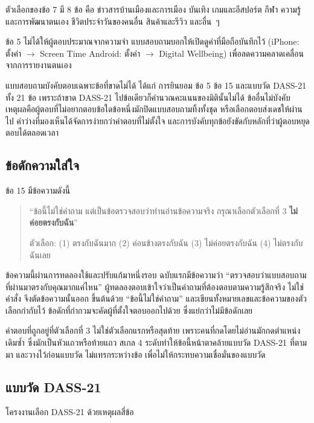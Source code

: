 ตัวเลือกของข้อ 7 มี 8 ข้อ คือ ข่าวสารบ้านเมืองและการเมือง บันเทิง เกมและอีสปอร์ต กีฬา
ความรู้และการพัฒนาตนเอง ชีวิตประจำวันของคนอื่น สินค้าและรีวิว และอื่น~ๆ

ข้อ 5 ไม่ได้ให้ผู้ตอบประมาณจากความจำ
แบบสอบถามบอกให้เปิดดูค่าที่มือถือบันทึกไว้
(iPhone: ตั้งค่า $\rightarrow$ Screen Time \quad Android: ตั้งค่า $\rightarrow$ Digital Wellbeing)
เพื่อลดความคลาดเคลื่อนจากการรายงานตนเอง

แบบสอบถามบังคับตอบเฉพาะข้อที่ขาดไม่ได้ ได้แก่ การยินยอม ข้อ 5 ข้อ 15 และแบบวัด DASS-21 ทั้ง 21 ข้อ
เพราะถ้าขาด DASS-21 ไปข้อเดียวก็คำนวณคะแนนของมิตินั้นไม่ได้
ข้ออื่นไม่บังคับ เหตุผลคือผู้ตอบที่ไม่อยากตอบข้อใดข้อหนึ่งมักปิดแบบสอบถามทิ้งทั้งชุด
หรือเลือกตอบส่งเดชให้ผ่านไป ค่าว่างที่มองเห็นได้จัดการง่ายกว่าคำตอบที่ไม่ตั้งใจ
และการบังคับทุกข้อยังขัดกับหลักที่ว่าผู้ตอบหยุดตอบได้ตลอดเวลา

\subsection{ข้อดักความใส่ใจ}

ข้อ 15 มีข้อความดังนี้

\begin{quote}
``ข้อนี้ไม่ใช่คำถาม แต่เป็นข้อตรวจสอบว่าท่านอ่านข้อความจริง
กรุณาเลือกตัวเลือกที่ 3 \textbf{ไม่ค่อยตรงกับฉัน}''

ตัวเลือก: (1) ตรงกับฉันมาก \quad (2) ค่อนข้างตรงกับฉัน
\quad (3) ไม่ค่อยตรงกับฉัน \quad (4) ไม่ตรงกับฉันเลย
\end{quote}

ข้อความนี้ผ่านการทดลองใช้และปรับแก้มาหนึ่งรอบ
ฉบับแรกมีข้อความว่า ``ตรวจสอบว่าแบบสอบถามที่ผ่านมาตรงกับคุณมากแค่ไหน''
ผู้ทดลองตอบเข้าใจว่าเป็นคำถามที่ต้องตอบตามความรู้สึกจริง ไม่ใช่คำสั่ง
จึงตัดข้อความนั้นออก ขึ้นต้นด้วย ``ข้อนี้ไม่ใช่คำถาม''
และเขียนทั้งหมายเลขและข้อความของตัวเลือกกำกับไว้
ข้อดักที่กำกวมจะคัดผู้ที่ตั้งใจตอบออกไปด้วย ซึ่งแย่กว่าไม่มีข้อดักเลย

คำตอบที่ถูกอยู่ที่ตัวเลือกที่ 3 ไม่ใช่ตัวเลือกแรกหรือสุดท้าย
เพราะคนที่กดโดยไม่อ่านมักกดตำแหน่งเดิมซ้ำ ซึ่งมักเป็นหัวแถวหรือท้ายแถว
สเกล 4 ระดับทำให้ข้อนี้หน้าตาคล้ายแบบวัด DASS-21 ที่ตามมา
และวางไว้ก่อนแบบวัด ไม่แทรกระหว่างข้อ เพื่อไม่ให้กระทบความเชื่อมั่นของแบบวัด

\subsection{แบบวัด DASS-21}

โครงงานเลือก DASS-21 ด้วยเหตุผลสี่ข้อ

